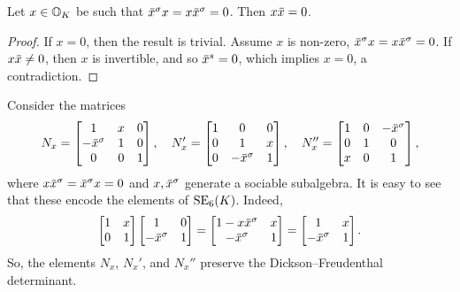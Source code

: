 \begin{lemma}
	\label{lemma:3_isotropic}
	Let $x \in \mathbb{O}_K$ be such that $\ovx^{\s} x = x \ovx^{\s} = 0$. Then $x\mathord{\mbox{\hspace*{0pt}}\,\overline{\!x\!\!\;}\!\:}\mbox{\hspace*{0pt}} = 0$.
\end{lemma}

\begin{proof}
	If $x = 0$, then the result is trivial. Assume $x$ is non-zero, $\ovx^{\s} x = x\ovx^{\s} = 0$.
	If $x \mathord{\mbox{\hspace*{0pt}}\,\overline{\!x\!\!\;}\!\:}\mbox{\hspace*{0pt}} \neq 0$, then $x$ is invertible, and so $\mathord{\mbox{\hspace*{0pt}}\,\overline{\!x\!\!\;}\!\:}\mbox{\hspace*{0pt}}^{s} = 0$, which implies $x = 0$, a 
	contradiction.
\end{proof}

Consider the matrices
\begin{equation}
	N_x = \begin{bmatrix}
		1 & x & 0 \\
		-\ovx^{\s} & 1 & 0 \\
		0 & 0 & 1
	\end{bmatrix},\quad
	N_x' = \begin{bmatrix}
		1 & 0 & 0 \\
		0 & 1 & x \\
		0 & -\ovx^{\s} & 1
	\end{bmatrix},\quad
	N_x'' = \begin{bmatrix}
		1 & 0 & -\ovx^{\s} \\
		0 & 1 & 0 \\
		x & 0 & 1
	\end{bmatrix},
\end{equation}
where $x\ovx^{\s} = \ovx^{\s}x = 0$ and $x,\mathord{\mbox{\hspace*{0pt}}\,\overline{\!x\!\!\;}\!\:}\mbox{\hspace*{0pt}}^{\sigma}$ generate a sociable subalgebra. 
It is easy to see that these encode the elements of $\mathrm{SE}_6(K)$. Indeed,
\begin{equation}
	\begin{bmatrix}
		1 & x \\
		0 & 1
	\end{bmatrix}
	\begin{bmatrix}
		1 & 0 \\
		-\ovx ^{\s} & 1
	\end{bmatrix} = 
	\begin{bmatrix}
		1 - x\ovx ^{\s} & x \\
		-\ovx ^{\s} & 1 
	\end{bmatrix} = 
	\begin{bmatrix}
		1 & x \\
		-\ovx ^{\s} & 1
	\end{bmatrix}.
\end{equation}
So, the elements $N_x$, $N_x'$, and $N_x''$ preserve the Dickson--Freudenthal determinant. 
